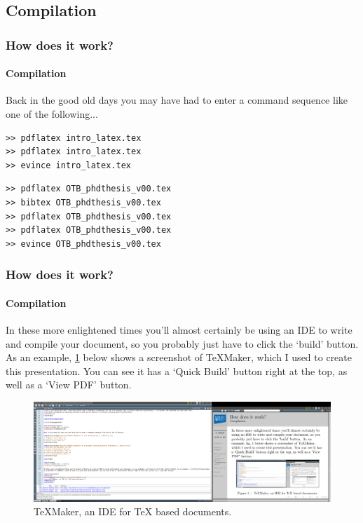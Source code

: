 \documentclass{beamer}
\begin{document}
\subsection{Compilation}

\lstset{language=bash}

\begin{frame}[fragile]
\frametitle{How does it work?}
\framesubtitle{Compilation}

Back in the good old days you may have had to enter a command sequence like one of the following...

\begin{lstlisting}[caption={Command sequence for this presentation.}, label={lst:1}]
>> pdflatex intro_latex.tex
>> pdflatex intro_latex.tex
>> evince intro_latex.tex
\end{lstlisting}

\begin{lstlisting}[caption={Command sequence for a document containing BibTeX references.}, label={lst:2}]
>> pdflatex OTB_phdthesis_v00.tex
>> bibtex OTB_phdthesis_v00.tex
>> pdflatex OTB_phdthesis_v00.tex
>> pdflatex OTB_phdthesis_v00.tex
>> evince OTB_phdthesis_v00.tex
\end{lstlisting}

\end{frame}

\begin{frame}
\frametitle{How does it work?}
\framesubtitle{Compilation}

In these more enlightened times you'll almost certainly be using an IDE to write and compile your document, so you probably just have to click the `build' button. As an example, \cref{fig:1} below shows a screenshot of TeXMaker, which I used to create this presentation. You can see it has a `Quick Build' button right at the top, as well as a `View PDF' button. 

\begin{figure}[h!]
\centering
\includegraphics[width=0.9\linewidth]{texmaker_scrn}
\caption{TeXMaker, an IDE for TeX based documents.}
\label{fig:1}
\end{figure}

\end{frame}
\end{document}
